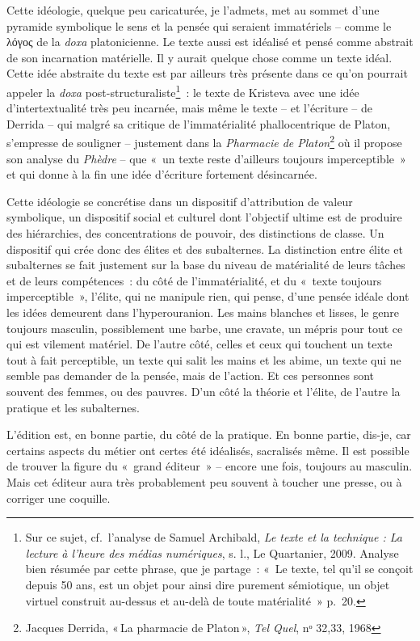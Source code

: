 Cette idéologie, quelque peu caricaturée, je l'admets, met au sommet
d'une pyramide symbolique le sens et la pensée qui seraient immatériels
-- comme le λόγος de la \emph{doxa} platonicienne. Le texte aussi est
idéalisé et pensé comme abstrait de son incarnation matérielle. Il y
aurait quelque chose comme un texte idéal. Cette idée abstraite du texte
est par ailleurs très présente dans ce qu'on pourrait appeler la
\emph{doxa} post-structuraliste\footnote{Sur ce sujet, cf.~l'analyse de
  Samuel Archibald, \emph{Le texte et la technique : {La} lecture à
  l'heure des médias numériques}, s. l., Le Quartanier, 2009. Analyse
  bien résumée par cette phrase, que je partage~: «~Le texte, tel qu'il
  se conçoit depuis 50 ans, est un objet pour ainsi dire purement
  sémiotique, un objet virtuel construit au-dessus et au-delà de toute
  matérialité~» p.~20.}~: le texte de Kristeva avec une idée
d'intertextualité très peu incarnée, mais même le texte -- et l'écriture
-- de Derrida -- qui malgré sa critique de l'immatérialité
phallocentrique de Platon, s'empresse de souligner -- justement dans la
\emph{Pharmacie de Platon}\footnote{Jacques Derrida, {«\,La pharmacie de
  {Platon}\,»}, \emph{Tel Quel}, nᵒ 32,33, 1968} où il propose son
analyse du \emph{Phèdre} -- que «~un texte reste d'ailleurs toujours
imperceptible~» et qui donne à la fin une idée d'écriture fortement
désincarnée.

Cette idéologie se concrétise dans un dispositif d'attribution de valeur
symbolique, un dispositif social et culturel dont l'objectif ultime est
de produire des hiérarchies, des concentrations de pouvoir, des
distinctions de classe. Un dispositif qui crée donc des élites et des
subalternes. La distinction entre élite et subalternes se fait justement
sur la base du niveau de matérialité de leurs tâches et de leurs
compétences~: du côté de l'immatérialité, et du «~texte toujours
imperceptible~», l'élite, qui ne manipule rien, qui pense, d'une pensée
idéale dont les idées demeurent dans l'hyperouranion. Les mains blanches
et lisses, le genre toujours masculin, possiblement une barbe, une
cravate, un mépris pour tout ce qui est vilement matériel. De l'autre
côté, celles et ceux qui touchent un texte tout à fait perceptible, un
texte qui salit les mains et les abime, un texte qui ne semble pas
demander de la pensée, mais de l'action. Et ces personnes sont souvent
des femmes, ou des pauvres. D'un côté la théorie et l'élite, de l'autre
la pratique et les subalternes.

L'édition est, en bonne partie, du côté de la pratique. En bonne partie,
dis-je, car certains aspects du métier ont certes été idéalisés,
sacralisés même. Il est possible de trouver la figure du «~grand
éditeur~» -- encore une fois, toujours au masculin. Mais cet éditeur
aura très probablement peu souvent à toucher une presse, ou à corriger
une coquille.

